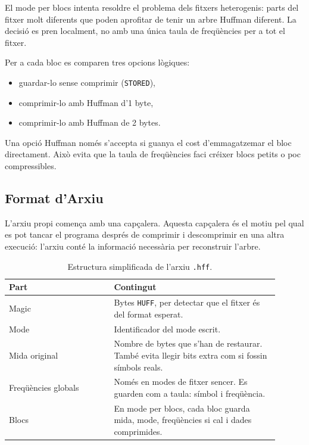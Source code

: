 \documentclass[conference,compsoc]{IEEEtran}
\begin{document}
El mode per blocs intenta resoldre el problema dels fitxers heterogenis:
parts del fitxer molt diferents que poden aprofitar de tenir un arbre
Huffman diferent. La decisió es pren localment, no amb una única taula de
freqüències per a tot el fitxer.

Per a cada bloc es comparen tres opcions lògiques:

\begin{itemize}
    \item guardar-lo sense comprimir (\texttt{STORED}),
    \item comprimir-lo amb Huffman d'1 byte,
    \item comprimir-lo amb Huffman de 2 bytes.
\end{itemize}

Una opció Huffman només s'accepta si guanya el cost d'emmagatzemar el
bloc directament. Això evita que la taula de freqüències faci créixer
blocs petits o poc compressibles.

\subsection{Format d'Arxiu}

L'arxiu propi comença amb una capçalera. Aquesta capçalera és el
motiu pel qual es pot tancar el programa després de comprimir i
descomprimir en una altra execució: l'arxiu conté la informació necessària
per reconstruir l'arbre.

\begin{table}[H]
\centering
\caption{Estructura simplificada de l'arxiu \texttt{.hff}.}
\label{tab:archive}
\begin{tabular}{@{}p{0.35\linewidth}p{0.55\linewidth}@{}}
\toprule
\textbf{Part} & \textbf{Contingut} \\
\midrule
Magic & Bytes \texttt{HUFF}, per detectar que el fitxer és del format esperat. \\
Mode & Identificador del mode escrit. \\
Mida original & Nombre de bytes que s'han de restaurar. També evita llegir bits extra com si fossin símbols reals. \\
Freqüències globals & Només en modes de fitxer sencer. Es guarden com a taula: símbol i freqüència. \\
Blocs & En mode per blocs, cada bloc guarda mida, mode, freqüències si cal i dades comprimides. \\
\bottomrule
\end{tabular}
\end{table}
\end{document}

